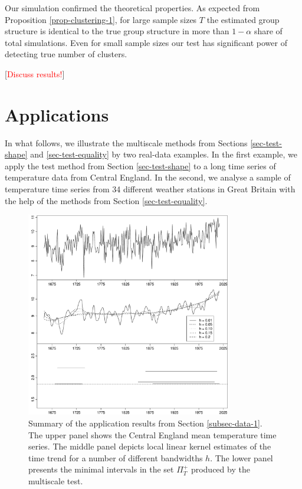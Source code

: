 Our simulation confirmed the theoretical properties. As expected from Proposition \ref{prop-clustering-1}, for large sample sizes $T$ the estimated group structure is identical to the true group structure in more than $1 - \alpha$ share of total simulations. Even for small sample sizes our test has significant power of detecting true number of clusters.

[\textcolor{red}{Discuss results!}]   


\section{Applications}\label{sec-data}

In what follows, we illustrate the multiscale methods from Sections \ref{sec-test-shape} and \ref{sec-test-equality} by two real-data examples. In the first example, we apply the test method from Section \ref{sec-test-shape} to a long time series of temperature data from Central England. In the second, we analyse a sample of temperature time series from 34 different weather stations in Great Britain with the help of the methods from Section \ref{sec-test-equality}. 


\begin{figure}[t]
\centering
\includegraphics[width=0.8\textwidth]{Plots/threegraphics_testing_constant_method_ll.pdf}
\vspace{0.2cm}

\caption{Summary of the application results from Section \ref{subsec-data-1}. The upper panel shows the Central England mean temperature time series. The middle panel depicts local linear kernel estimates of the time trend for a number of different bandwidths $h$. The lower panel presents the minimal intervals in the set $\Pi_T^+$ produced by the multiscale test.}\label{plot-results-app1}
\end{figure}


